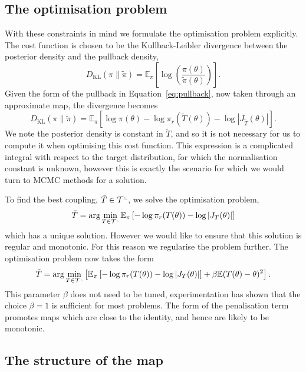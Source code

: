 \documentclass[final]{siamltex}
\newcommand{\ltri}{%
\,\resizebox{!}{0.25\baselineskip}{%
\begin{tikzpicture}%
\draw[line width=1mm](0,0) -- (0,2) -- (2,0)  -- (0,0);
\end{tikzpicture}%
}\xspace%
}%
\newcommand{\smallltri}{%
\,\resizebox{!}{0.15\baselineskip}{%
\begin{tikzpicture}%
\draw[line width=1mm](0,0) -- (0,2) -- (2,0)  -- (0,0);
\end{tikzpicture}%
}\xspace%
}%
\begin{document}
\subsection{The optimisation problem}

With these constraints in mind we formulate the optimisation problem explicitly. The cost function
is chosen to be the Kullback-Leibler divergence between the posterior density and the pullback density,
\[
	D_\text{KL}(\pi\|\tilde{\pi}) =
		\mathbb{E}_\pi\left[\log\left(\frac{\pi(\theta)}{\tilde{\pi}(\theta)}\right)\right].
\]
Given the form of the pullback in Equation~\eqref{eq:pullback}, now taken through an approximate map, the divergence becomes
\[
	D_\text{KL}(\pi\|\tilde{\pi}) = \mathbb{E}_\pi\left[\log\pi(\theta) - \log\pi_r(\tilde{T}(\theta)) -
		\log\left|J_{\tilde{T}}(\theta)\right|\right].
\]
We note the posterior density is constant in $\tilde{T}$, and so it is not necessary for us to compute it when optimising this cost function. This expression is a complicated integral with respect to the target distribution, for which the normalisation constant is unknown, however this is exactly the scenario for which we would turn to MCMC methods for a solution.

To find the best coupling, $\tilde{T} \in \mathcal{T}^{\ltri}$, we solve the optimisation problem,
\[
	\tilde{T} = \arg\min_{T \in \mathcal{T}^{\smallltri}} \mathbb{E}_\pi\left[-\log\pi_r(T(\theta)) -
		\log\left|J_T(\theta)\right|\right]
\]
which has a unique solution. However we would like to ensure that this solution is regular and monotonic. For this
reason we regularise the problem further. The optimisation problem now takes the form
\begin{equation}\label{eq:gen_map_optim}
	\tilde{T} = \arg\min_{T\in\mathcal{T}^{\smallltri}} \left[
		 \mathbb{E}_\pi\left[-\log\pi_r(T(\theta)) -
		\log\left|J_T(\theta)\right|\right] + \beta\mathbb{E}(T(\theta)- \theta)^2 \right].
\end{equation}
This parameter $\beta$ does not need to be tuned, experimentation has shown that the choice
$\beta=1$ is sufficient for most problems. The form of the penalisation term promotes maps which are
close to the identity, and hence are likely to be monotonic.

\subsection{The structure of the map}
\end{document}
